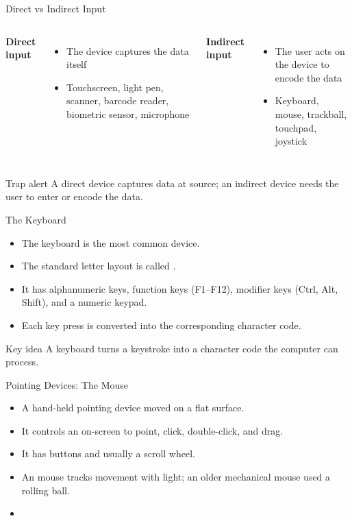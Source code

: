 \documentclass[aspectratio=169]{beamer}
\begin{document}
\begin{frame}{Direct vs Indirect Input}
  \begin{columns}[T]
      \textbf{Direct input}
      \begin{itemize}
        \item The device captures the data itself
        \item Touchscreen, light pen, scanner, barcode reader, biometric
          sensor, microphone
      \end{itemize}
      \textbf{Indirect input}
      \begin{itemize}
        \item The user acts on the device to encode the data
        \item Keyboard, mouse, trackball, touchpad, joystick
      \end{itemize}
  \end{columns}
  \vspace{0.3cm}
  \begin{alertblock}{Trap alert}
    A direct device captures data at source; an indirect device needs the
    user to enter or encode the data.
  \end{alertblock}
\end{frame}

\begin{frame}{The Keyboard}
  \begin{itemize}
    \item The keyboard is the most common  device.
    \item The standard letter layout is called .
    \item It has alphanumeric keys, function keys (F1--F12), modifier keys
      (Ctrl, Alt, Shift), and a numeric keypad.
    \item Each key press is converted into the corresponding character code.
  \end{itemize}
  \begin{block}{Key idea}
    A keyboard turns a keystroke into a character code the computer can
    process.
  \end{block}
\end{frame}

\begin{frame}{Pointing Devices: The Mouse}
  \begin{itemize}
    \item A hand-held pointing device moved on a flat surface.
    \item It controls an on-screen  to point, click,
      double-click, and drag.
    \item It has buttons and usually a scroll wheel.
    \item An  mouse tracks movement with light; an older
      mechanical mouse used a rolling ball.
    \item {}
  \end{itemize}
\end{frame}
\end{document}

